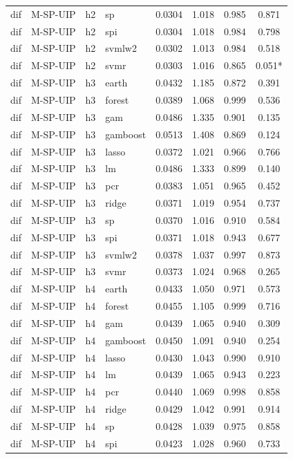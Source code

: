 \begin{ThreePartTable}
\begin{longtable}[t]{llclcccc}
dif & M-SP-UIP & h2 & sp & 0.0304 & 1.018 & 0.985 & 0.871\\
dif & M-SP-UIP & h2 & spi & 0.0304 & 1.018 & 0.984 & 0.798\\
dif & M-SP-UIP & h2 & svmlw2 & 0.0302 & 1.013 & 0.984 & 0.518\\
dif & M-SP-UIP & h2 & svmr & 0.0303 & 1.016 & 0.865 & 0.051*\\
\addlinespace
dif & M-SP-UIP & h3 & earth & 0.0432 & 1.185 & 0.872 & 0.391\\
dif & M-SP-UIP & h3 & forest & 0.0389 & 1.068 & 0.999 & 0.536\\
dif & M-SP-UIP & h3 & gam & 0.0486 & 1.335 & 0.901 & 0.135\\
dif & M-SP-UIP & h3 & gamboost & 0.0513 & 1.408 & 0.869 & 0.124\\
dif & M-SP-UIP & h3 & lasso & 0.0372 & 1.021 & 0.966 & 0.766\\
dif & M-SP-UIP & h3 & lm & 0.0486 & 1.333 & 0.899 & 0.140\\
dif & M-SP-UIP & h3 & pcr & 0.0383 & 1.051 & 0.965 & 0.452\\
dif & M-SP-UIP & h3 & ridge & 0.0371 & 1.019 & 0.954 & 0.737\\
dif & M-SP-UIP & h3 & sp & 0.0370 & 1.016 & 0.910 & 0.584\\
dif & M-SP-UIP & h3 & spi & 0.0371 & 1.018 & 0.943 & 0.677\\
dif & M-SP-UIP & h3 & svmlw2 & 0.0378 & 1.037 & 0.997 & 0.873\\
dif & M-SP-UIP & h3 & svmr & 0.0373 & 1.024 & 0.968 & 0.265\\
\addlinespace
dif & M-SP-UIP & h4 & earth & 0.0433 & 1.050 & 0.971 & 0.573\\
dif & M-SP-UIP & h4 & forest & 0.0455 & 1.105 & 0.999 & 0.716\\
dif & M-SP-UIP & h4 & gam & 0.0439 & 1.065 & 0.940 & 0.309\\
dif & M-SP-UIP & h4 & gamboost & 0.0450 & 1.091 & 0.940 & 0.254\\
dif & M-SP-UIP & h4 & lasso & 0.0430 & 1.043 & 0.990 & 0.910\\
dif & M-SP-UIP & h4 & lm & 0.0439 & 1.065 & 0.943 & 0.223\\
dif & M-SP-UIP & h4 & pcr & 0.0440 & 1.069 & 0.998 & 0.858\\
dif & M-SP-UIP & h4 & ridge & 0.0429 & 1.042 & 0.991 & 0.914\\
dif & M-SP-UIP & h4 & sp & 0.0428 & 1.039 & 0.975 & 0.858\\
dif & M-SP-UIP & h4 & spi & 0.0423 & 1.028 & 0.960 & 0.733\\

\end{longtable}
\end{ThreePartTable}
